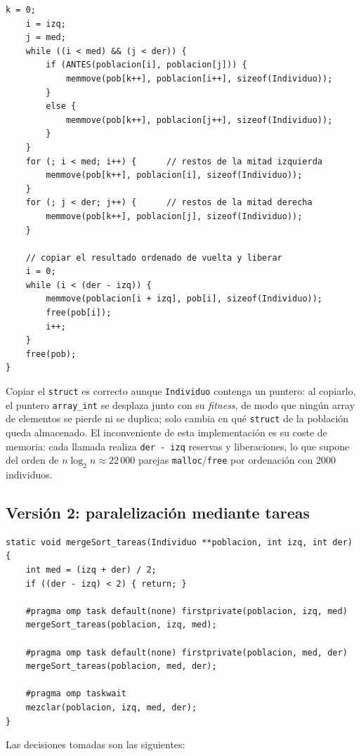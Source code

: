 \documentclass[12pt]{article}
\begin{document}
\begin{enumerate}
\begin{lstlisting}[style=EstiloC]
    k = 0;
    i = izq;
    j = med;
    while ((i < med) && (j < der)) {
        if (ANTES(poblacion[i], poblacion[j])) {
            memmove(pob[k++], poblacion[i++], sizeof(Individuo));
        }
        else {
            memmove(pob[k++], poblacion[j++], sizeof(Individuo));
        }
    }
    for (; i < med; i++) {      // restos de la mitad izquierda
        memmove(pob[k++], poblacion[i], sizeof(Individuo));
    }
    for (; j < der; j++) {      // restos de la mitad derecha
        memmove(pob[k++], poblacion[j], sizeof(Individuo));
    }
 
    // copiar el resultado ordenado de vuelta y liberar
    i = 0;
    while (i < (der - izq)) {
        memmove(poblacion[i + izq], pob[i], sizeof(Individuo));
        free(pob[i]);
        i++;
    }
    free(pob);
}
\end{lstlisting}
 
Copiar el \texttt{struct} es correcto aunque \texttt{Individuo} contenga un puntero: al copiarlo, el puntero \texttt{array\_int} se desplaza junto con su \textit{fitness}, de modo que ningún array de elementos se pierde ni se duplica; solo cambia en qué \texttt{struct} de la población queda almacenado. El inconveniente de esta implementación es su coste de memoria: cada llamada realiza \texttt{der - izq} reservas y liberaciones, lo que supone del orden de $n \log_2 n \approx 22\,000$ parejas \texttt{malloc}/\texttt{free} por ordenación con 2000 individuos.
 
\subsection*{Versión 2: paralelización mediante tareas}
 
\begin{lstlisting}[style=EstiloC]
static void mergeSort_tareas(Individuo **poblacion, int izq, int der)
{
    int med = (izq + der) / 2;
    if ((der - izq) < 2) { return; }
 
    #pragma omp task default(none) firstprivate(poblacion, izq, med)
    mergeSort_tareas(poblacion, izq, med);
 
    #pragma omp task default(none) firstprivate(poblacion, med, der)
    mergeSort_tareas(poblacion, med, der);
 
    #pragma omp taskwait
    mezclar(poblacion, izq, med, der);
}
\end{lstlisting}
 
Las decisiones tomadas son las siguientes:
 

\end{enumerate}
\end{document}
